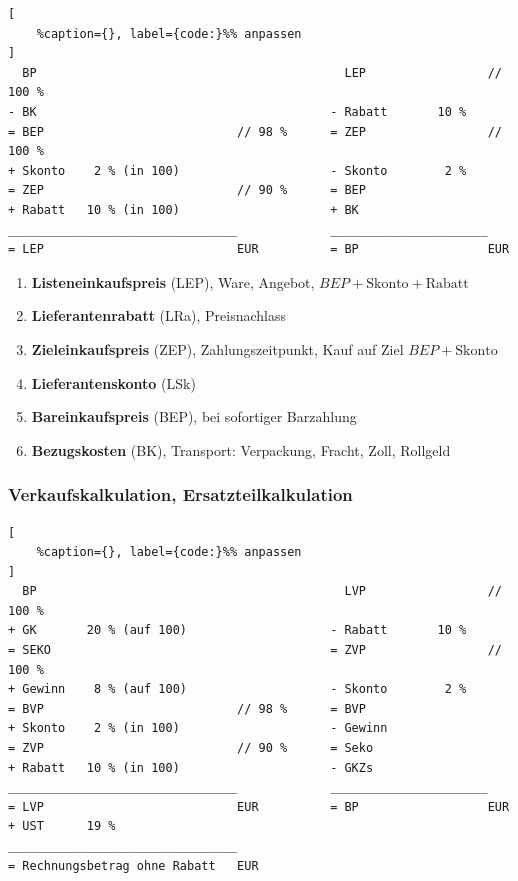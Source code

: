 \lstset{language=Bash}%
\begin{lstlisting}[
	%caption={}, label={code:}%% anpassen
]
  BP                                           LEP                 // 100 %
- BK                                         - Rabatt       10 %                 
= BEP                           // 98 %      = ZEP                 // 100 % 
+ Skonto    2 % (in 100)                     - Skonto        2 %
= ZEP                           // 90 %      = BEP                 
+ Rabatt   10 % (in 100)                     + BK
________________________________             ______________________         
= LEP                           EUR          = BP                  EUR 
\end{lstlisting}

\begin{enumerate}
\item
  \textbf{Listeneinkaufspreis} (LEP), Ware, Angebot,
  $\boxed{BEP + \text{Skonto} + \text{Rabatt}}$
\item
  \textbf{Lieferantenrabatt} (LRa), Preisnachlass
\item
  \textbf{Zieleinkaufspreis} (ZEP), Zahlungszeitpunkt, Kauf auf Ziel
  $\boxed{BEP + \text{Skonto}}$
\item
  \textbf{Lieferantenskonto} (LSk)
\item
  \textbf{Bareinkaufspreis} (BEP), bei sofortiger Barzahlung
\item
  \textbf{Bezugskosten} (BK), Transport: Verpackung, Fracht, Zoll,
  Rollgeld
\end{enumerate}

\subsubsection{Verkaufskalkulation,
Ersatzteilkalkulation}\label{verkaufskalkulation-ersatzteilkalkulation}

\lstset{language=Bash}%
\begin{lstlisting}[
	%caption={}, label={code:}%% anpassen
]
  BP                                           LVP                 // 100 %
+ GK       20 % (auf 100)                    - Rabatt       10 %                 
= SEKO                                       = ZVP                 // 100 %
+ Gewinn    8 % (auf 100)                    - Skonto        2 %
= BVP                           // 98 %      = BVP        
+ Skonto    2 % (in 100)                     - Gewinn
= ZVP                           // 90 %      = Seko                 
+ Rabatt   10 % (in 100)                     - GKZs
________________________________             ______________________          
= LVP                           EUR          = BP                  EUR
+ UST      19 %                                                 
________________________________                        
= Rechnungsbetrag ohne Rabatt   EUR                                 
\end{lstlisting}

